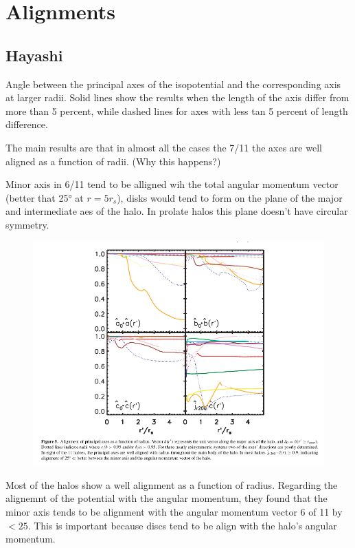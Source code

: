 \documentclass[16pt]{article}
\begin{document}
\section{Alignments}

\subsection{Hayashi}

Angle between the principal axes of the isopotential and the corresponding
axis at larger radii. Solid lines show the results when the length of the 
axis differ from more than 5 percent, while dashed lines for axes with 
less tan 5 percent of length difference.

The main results are that in almost all the cases the 7/11 the axes are 
well aligned as a function of radii. (Why this happens?)

Minor axis in 6/11 tend to be alligned wih the total angular momentum vector 
(better that 25° at $r=5r_s$), disks would tend to form on the plane of 
the major and intermediate aes of the halo. In prolate halos this plane
doesn't have circular symmetry.


\begin{figure}
\includegraphics[scale=0.5]{alignmentH.png}
\end{figure}		

Most of the halos show a well alignment as a function of radius. 
Regarding the alignemnt of the potential with the angular momentum, they 
found that the minor axis tends to be alignment with the angular 
momentum vector 6 of 11 by $<25$. This is important because discs tend 
to be align with the halo's angular momentum. 
\end{document}
